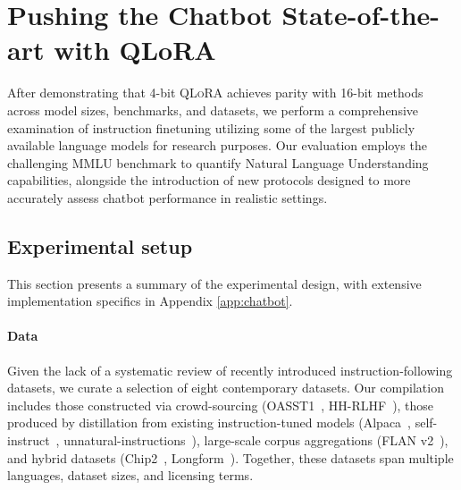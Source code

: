 \section{Pushing the Chatbot State-of-the-art with QLoRA}
\label{sec:pushing}
After demonstrating that 4-bit \textsc{QLoRA} achieves parity with 16-bit methods across model sizes, benchmarks, and datasets, we perform a comprehensive examination of instruction finetuning utilizing some of the largest publicly available language models for research purposes. Our evaluation employs the challenging MMLU benchmark to quantify Natural Language Understanding capabilities, alongside the introduction of new protocols designed to more accurately assess chatbot performance in realistic settings.

\subsection{Experimental setup} This section presents a summary of the experimental design, with extensive implementation specifics in Appendix \ref{app:chatbot}.

\paragraph{Data} Given the lack of a systematic review of recently introduced instruction-following datasets, we curate a selection of eight contemporary datasets. Our compilation includes those constructed via crowd-sourcing (OASST1~\citep{kopf2023openassistant}, HH-RLHF~\citep{bai2022training}), those produced by distillation from existing instruction-tuned models (Alpaca~\citep{alpaca}, self-instruct~\citep{wang2022self}, unnatural-instructions~\citep{honovich2022unnatural}), large-scale corpus aggregations (FLAN v2~\citep{chung2022scaling}), and hybrid datasets (Chip2~\citep{laion2023}, Longform~\citep{koksal2023longform}). Together, these datasets span multiple languages, dataset sizes, and licensing terms.

